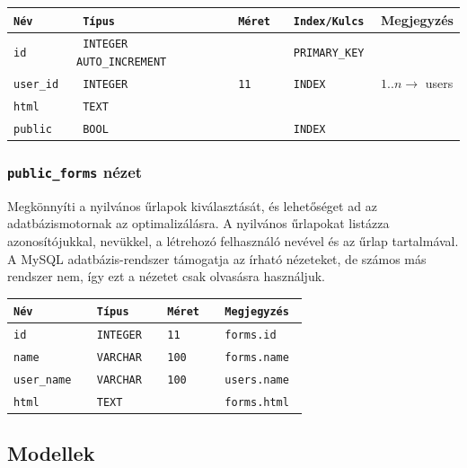 \documentclass[12pt,a4paper,twoside]{article}
\begin{document}
\small
\vspace{.3cm}
\begin{tabular*}{\textwidth}{>{\tt}l>{\tt}l>{\tt}l>{\tt}l|l}
  \rm Név    & \rm Típus &  \rm Méret  & \rm Index/Kulcs & Megjegyzés\\
  \hline
  id        & INTEGER AUTO\_INCREMENT && PRIMARY\_KEY   &                            \\
  user\_id  & INTEGER   & 11          & INDEX           & $1..n \rightarrow{}$ users \\
  html      & TEXT      &             &                 &                            \\
  public    & BOOL      &             & INDEX           &
\end{tabular*}
\normalsize

\clearpage

\subsubsection{\texttt{public\_forms} nézet}

Megkönnyíti a nyilvános űrlapok kiválasztását, és lehetőséget ad az
adatbázismotornak az optimalizálásra. A nyilvános űrlapokat listázza
azonosítójukkal, nevükkel, a létrehozó felhasználó nevével és az űrlap
tartalmával. A MySQL adatbázis-rendszer támogatja az írható nézeteket, de számos
más rendszer nem, így ezt a nézetet csak olvasásra használjuk.

\small
\vspace{.3cm}
\begin{tabular*}{\textwidth}{>{\tt}l>{\tt}l>{\tt}l|>{\tt}l}
  \rm Név     &  \rm Típus    &  \rm Méret  & Megjegyzés \\
  \hline
  id         &  INTEGER      &  11         & forms.id   \\
  name       &  VARCHAR      &  100        & forms.name \\
  user\_name &  VARCHAR      &  100        & users.name \\
  html       &  TEXT         &             & forms.html
\end{tabular*}
\normalsize


\subsection{Modellek}
\label{sec:modellek}
\end{document}

